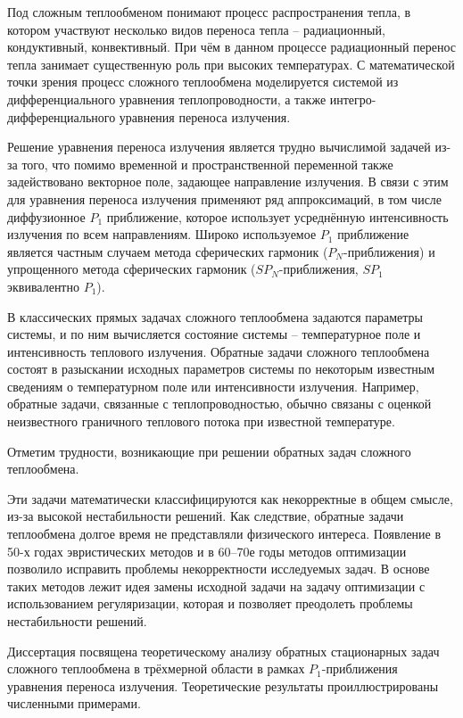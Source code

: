    {\actuality}
    Под сложным теплообменом понимают процесс распространения тепла,
    в котором участвуют несколько видов переноса тепла – радиационный, кондуктивный, конвективный.
    При чём в данном процессе радиационный перенос тепла занимает существенную роль при высоких температурах.
    С математической точки зрения процесс сложного теплообмена моделируется системой из
    дифференциального уравнения теплопроводности, а также интегро-дифференциального
    уравнения переноса излучения.


    Решение уравнения переноса излучения является трудно вычислимой задачей из-за того,
    что помимо временной и пространственной переменной также задействовано
    векторное поле, задающее направление излучения.
    В связи с этим для уравнения переноса излучения применяют ряд аппроксимаций,
    в том числе диффузионное $P_1$ приближение, которое использует
    усреднённую интенсивность излучения по всем направлениям.
    Широко используемое $P_1$ приближение является частным случаем метода сферических
    гармоник ($P_N$-приближения) и упрощенного метода сферических гармоник
    ($SP_N$-приближения, $SP_1$ эквивалентно $P_1$).


    В классических прямых задачах сложного теплообмена задаются параметры системы, и по ним вычисляется
    состояние системы – температурное поле и интенсивность теплового излучения.
    Обратные задачи сложного теплообмена состоят в разыскании исходных параметров системы по некоторым
    известным сведениям о температурном поле или интенсивности излучения.
    Например, обратные задачи, связанные с теплопроводностью, обычно связаны с
    оценкой неизвестного граничного теплового потока при известной температуре.


    Отметим трудности, возникающие при решении обратных задач сложного теплообмена.


    Эти задачи математически классифицируются как некорректные в общем смысле,
    из-за высокой нестабильности решений.
    Как следствие, обратные задачи теплообмена долгое время не представляли физического интереса.
    Появление в 50-х годах эвристических методов и в 60–70е годы методов оптимизации
    позволило исправить проблемы некорректности исследуемых задач.
    В основе таких методов лежит идея замены исходной задачи на задачу оптимизации
    с использованием регуляризации, которая и позволяет преодолеть проблемы нестабильности решений.


    Диссертация посвящена теоретическому анализу обратных стационарных
    задач сложного теплообмена в трёхмерной области в рамках $P_1$-приближения
    уравнения переноса излучения.
    Теоретические результаты проиллюстрированы численными примерами.


